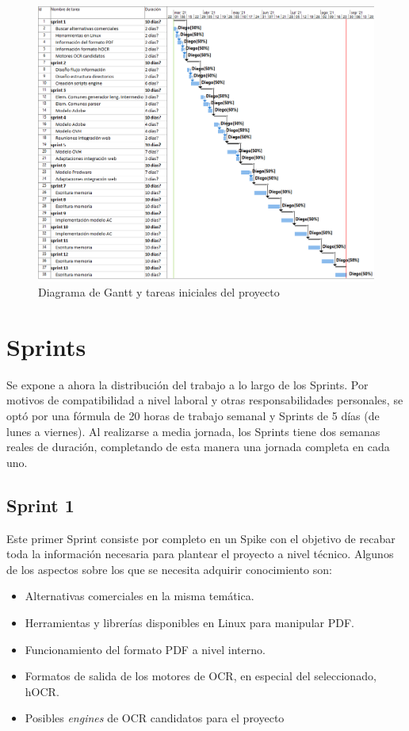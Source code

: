 \begin{figure}[hp!]
    \centering
    \includegraphics[angle=90,width=1.0\textwidth]{imaxes/f-planificacion/gantt-inicial.png}
    \caption{Diagrama de Gantt y tareas iniciales del proyecto}
    \label{fig:gantt-inicial}
\end{figure}

\section{Sprints}

Se expone a ahora la distribución del trabajo a lo largo de los Sprints. Por motivos de compatibilidad a nivel laboral y otras responsabilidades personales, se optó por una fórmula de 20 horas de trabajo semanal y Sprints de 5 días (de lunes a viernes). Al realizarse a media jornada, los Sprints tiene dos semanas reales de duración, completando de esta manera una jornada completa en cada uno.

\subsection{Sprint 1}

Este primer Sprint consiste por completo en un Spike con el objetivo de recabar toda la información necesaria para plantear el proyecto a nivel técnico. Algunos de los aspectos sobre los que se necesita adquirir conocimiento son:

\begin{itemize}
    \item Alternativas comerciales en la misma temática.
    \item Herramientas y librerías disponibles en Linux para manipular PDF.
    \item Funcionamiento del formato PDF a nivel interno.
    \item Formatos de salida de los motores de OCR, en especial del seleccionado, hOCR.
    \item Posibles \emph{engines} de OCR candidatos para el proyecto
\end{itemize}


